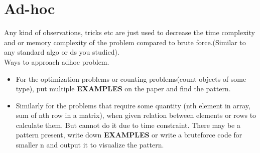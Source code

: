 \documentclass[../Notes.tex]{subfiles}
\begin{document}
\chapter{Ad-hoc}
Any kind of observations, tricks etc are just used to decrease the time complexity and or memory complexity of the problem compared to brute force.(Similar to any standard  algo or ds you studied).\\

Ways to approach adhoc problem.
\begin{itemize}
	\item For the optimization problems or counting problems(count objects of some type), put multiple \textbf{EXAMPLES} on the paper and find the pattern.
	\item Similarly for the problems that require some quantity (nth element in array, sum of nth row in a matrix), when given relation between elements or rows to calculate them. But cannot do it due to time constraint. There may be a pattern present, write down \textbf{EXAMPLES} or write a bruteforce code for smaller n and output it to visualize the pattern.
\end{itemize}
\end{document}
